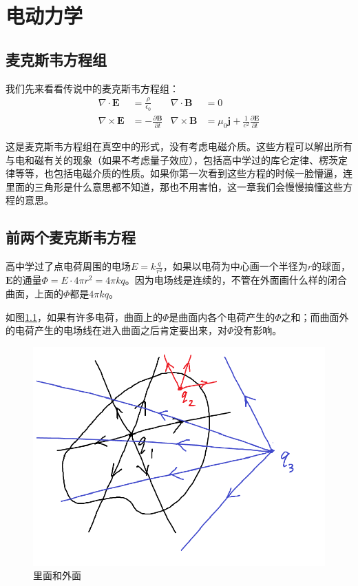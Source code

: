 \chapter{电动力学}
\section{麦克斯韦方程组}
我们先来看看传说中的麦克斯韦方程组：
\begin{align*}
\nabla \cdot \mathbf{E}&=\frac{\rho}{\epsilon_0} & \nabla \cdot \mathbf{B}&=0 \\
\nabla \times \mathbf{E}&=-\frac{\partial \mathbf{B}}{\partial t} & \nabla \times \mathbf{B}&=\mu_0 \mathbf{j}+\frac{1}{c^2} \frac{\partial \mathbf{E}}{\partial t}
\end{align*}

这是麦克斯韦方程组在真空中的形式，没有考虑电磁介质。这些方程可以解出所有与电和磁有关的现象（如果不考虑量子效应），包括高中学过的库仑定律、楞茨定律等等，也包括电磁介质的性质。如果你第一次看到这些方程的时候一脸懵逼，连里面的三角形是什么意思都不知道，那也不用害怕，这一章我们会慢慢搞懂这些方程的意思。
\section{前两个麦克斯韦方程}
高中学过了点电荷周围的电场$E=k \frac{q}{r^2}$，如果以电荷为中心画一个半径为$r$的球面，$\mathbf{E}$的通量$\Phi=E \cdot 4 \pi r^2=4 \pi k q$。因为电场线是连续的，不管在外面画什么样的闭合曲面，上面的$\Phi$都是$4 \pi k q$。

如图\ref{fig-elec-flux}，如果有许多电荷，曲面上的$\Phi$是曲面内各个电荷产生的$\Phi$之和；而曲面外的电荷产生的电场线在进入曲面之后肯定要出来，对$\Phi$没有影响。
\begin{figure}[htb]
\centering
\includegraphics[scale=0.5]{fig/elec-flux.png}
\caption{里面和外面}
\label{fig-elec-flux}
\end{figure}

